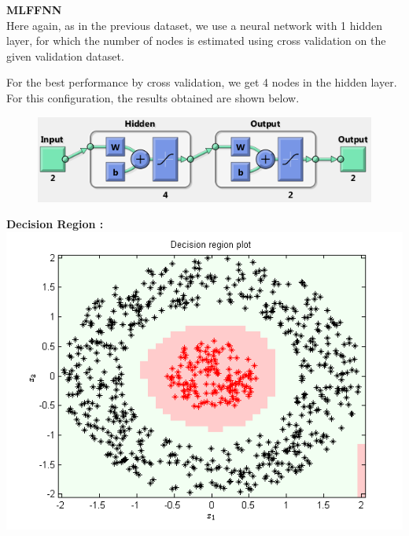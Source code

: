 \documentclass{article}
\begin{document}
\begin{flushleft}
\textbf{MLFFNN} \\[10pt]
Here again, as in the previous dataset, we use a neural network with 1 hidden layer, for which the number of nodes is estimated using cross validation on the given validation dataset.

For the best performance by cross validation, we get 4 nodes in the hidden layer. For this configuration, the results obtained are shown below.
\\[5pt]
\begin{figure}[H]
\centering
\includegraphics[scale=0.6]{Classification/nonlinearlySeparable/net_config} 
\end{figure}
\newpage

\textbf{Decision Region :\\[5pt]}
\includegraphics[scale=1]{Classification/nonlinearlySeparable/decn_region_nn_nls}
\end{flushleft}
\end{document}
